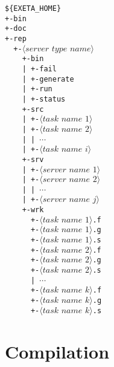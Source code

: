 \documentclass[a4paper,12pt,english,oneside]{book}
\begin{document}
\verb!${EXETA_HOME}!\\
\verb!+-bin!\\
\verb!+-doc!\\
\verb!+-rep!\\
\verb!  +-!$\langle\textit{server type name}\rangle$\\
\verb!    +-bin!\\
\verb!    | +-fail!\\
\verb!    | +-generate!\\
\verb!    | +-run!\\
\verb!    | +-status!\\
\verb!    +-src!\\
\verb!    | +-!$\langle\textit{task name 1}\rangle$\\
\verb!    | +-!$\langle\textit{task name 2}\rangle$\\
\verb!    | | !$\cdots$\\
\verb!    | +-!$\langle\textit{task name i}\rangle$\\
\verb!    +-srv!\\
\verb!    | +-!$\langle\textit{server name 1}\rangle$\\
\verb!    | +-!$\langle\textit{server name 2}\rangle$\\
\verb!    | | !$\cdots$\\
\verb!    | +-!$\langle\textit{server name j}\rangle$\\
\verb!    +-wrk!\\
\verb!      +-!$\langle\textit{task name 1}\rangle$\verb!.f!\\
\verb!      +-!$\langle\textit{task name 1}\rangle$\verb!.g!\\
\verb!      +-!$\langle\textit{task name 1}\rangle$\verb!.s!\\
\verb!      +-!$\langle\textit{task name 2}\rangle$\verb!.f!\\
\verb!      +-!$\langle\textit{task name 2}\rangle$\verb!.g!\\
\verb!      +-!$\langle\textit{task name 2}\rangle$\verb!.s!\\
\verb!      | !$\cdots$\\
\verb!      +-!$\langle\textit{task name k}\rangle$\verb!.f!\\
\verb!      +-!$\langle\textit{task name k}\rangle$\verb!.g!\\
\verb!      +-!$\langle\textit{task name k}\rangle$\verb!.s!\\

\section{Compilation}
\end{document}

